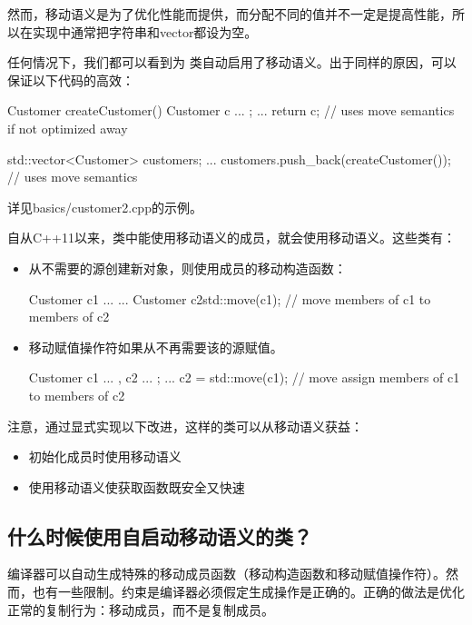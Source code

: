 然而，移动语义是为了优化性能而提供，而分配不同的值并不一定是提高性能，所以在实现中通常把字符串和vector都设为空。

任何情况下，我们都可以看到为  类自动启用了移动语义。出于同样的原因，可以保证以下代码的高效：

\begin{cppcode}
Customer createCustomer()
{
	Customer c{ ... };
	...
	return c; // uses move semantics if not optimized away
}

std::vector<Customer> customers;
...
customers.push_back(createCustomer()); // uses move semantics
\end{cppcode}

详见basics/customer2.cpp的示例。

自从C++11以来，类中能使用移动语义的成员，就会使用移动语义。这些类有：

\begin{itemize}
	\item 从不需要的源创建新对象，则使用成员的移动构造函数：

	\begin{cppcode}
Customer c1{ ... }
...
Customer c2{std::move(c1)}; // move members of c1 to members of c2
	\end{cppcode}
	\item 移动赋值操作符如果从不再需要该的源赋值。

	\begin{cppcode}
Customer c1{ ... }, c2{ ... };
...
c2 = std::move(c1); // move assign members of c1 to members of c2
	\end{cppcode}
\end{itemize}

注意，通过显式实现以下改进，这样的类可以从移动语义获益：

\begin{itemize}
	\item 初始化成员时使用移动语义
	\item 使用移动语义使获取函数既安全又快速
\end{itemize}

\subsection{什么时候使用自启动移动语义的类？}

编译器可以自动生成特殊的移动成员函数（移动构造函数和移动赋值操作符）。然而，也有一些限制。约束是编译器必须假定生成操作是正确的。正确的做法是优化正常的复制行为：移动成员，而不是复制成员。

